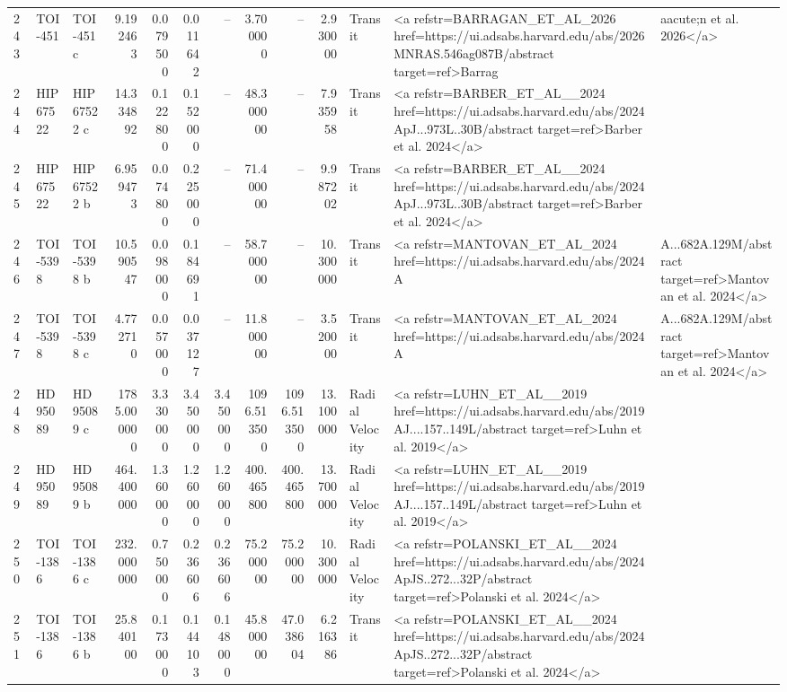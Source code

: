 \begin{tabular}{lllrrrrrrrll}
243 & TOI-451 & TOI-451 c & 9.192463 & 0.079500 & 0.011642 & -- & 3.700000 & -- & 2.930000 & Transit & <a refstr=BARRAGAN_ET_AL_2026 href=https://ui.adsabs.harvard.edu/abs/2026MNRAS.546ag087B/abstract target=ref>Barrag&aacute;n et al. 2026</a> \\
244 & HIP 67522 & HIP 67522 c & 14.334892 & 0.122800 & 0.152000 & -- & 48.300000 & -- & 7.935958 & Transit & <a refstr=BARBER_ET_AL__2024 href=https://ui.adsabs.harvard.edu/abs/2024ApJ...973L..30B/abstract target=ref>Barber et al. 2024</a> \\
245 & HIP 67522 & HIP 67522 b & 6.959473 & 0.074800 & 0.225000 & -- & 71.400000 & -- & 9.987202 & Transit & <a refstr=BARBER_ET_AL__2024 href=https://ui.adsabs.harvard.edu/abs/2024ApJ...973L..30B/abstract target=ref>Barber et al. 2024</a> \\
246 & TOI-5398 & TOI-5398 b & 10.590547 & 0.098000 & 0.184691 & -- & 58.700000 & -- & 10.300000 & Transit & <a refstr=MANTOVAN_ET_AL_2024 href=https://ui.adsabs.harvard.edu/abs/2024A&A...682A.129M/abstract target=ref>Mantovan et al. 2024</a> \\
247 & TOI-5398 & TOI-5398 c & 4.772710 & 0.057000 & 0.037127 & -- & 11.800000 & -- & 3.520000 & Transit & <a refstr=MANTOVAN_ET_AL_2024 href=https://ui.adsabs.harvard.edu/abs/2024A&A...682A.129M/abstract target=ref>Mantovan et al. 2024</a> \\
248 & HD 95089 & HD 95089 c & 1785.000000 & 3.330000 & 3.450000 & 3.450000 & 1096.513500 & 1096.513500 & 13.100000 & Radial Velocity & <a refstr=LUHN_ET_AL__2019 href=https://ui.adsabs.harvard.edu/abs/2019AJ....157..149L/abstract target=ref>Luhn et al. 2019</a> \\
249 & HD 95089 & HD 95089 b & 464.400000 & 1.360000 & 1.260000 & 1.260000 & 400.465800 & 400.465800 & 13.700000 & Radial Velocity & <a refstr=LUHN_ET_AL__2019 href=https://ui.adsabs.harvard.edu/abs/2019AJ....157..149L/abstract target=ref>Luhn et al. 2019</a> \\
250 & TOI-1386 & TOI-1386 c & 232.000000 & 0.750000 & 0.236606 & 0.236606 & 75.200000 & 75.200000 & 10.300000 & Radial Velocity & <a refstr=POLANSKI_ET_AL__2024 href=https://ui.adsabs.harvard.edu/abs/2024ApJS..272...32P/abstract target=ref>Polanski et al. 2024</a> \\
251 & TOI-1386 & TOI-1386 b & 25.840100 & 0.173000 & 0.144103 & 0.148000 & 45.800000 & 47.038604 & 6.216386 & Transit & <a refstr=POLANSKI_ET_AL__2024 href=https://ui.adsabs.harvard.edu/abs/2024ApJS..272...32P/abstract target=ref>Polanski et al. 2024</a> \\

\end{tabular}

